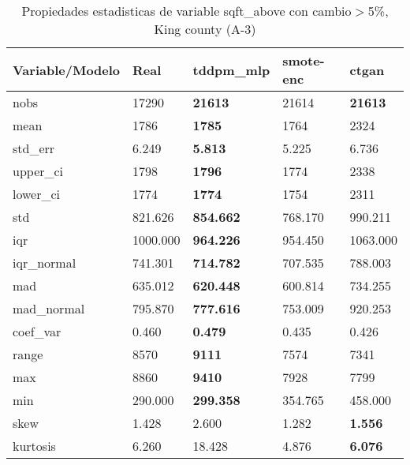 \begin{table}[H]
\centering
\fontsize{8}{14}\selectfont
\caption{Propiedades estadisticas de variable sqft\_above con cambio\ensuremath{>}5\%, King county (A-3)}
\label{table-stats-king county-a-3-sqft_above-short}
\begin{tabular}{|l|m{10em}|m{10em}|m{10em}|m{10em}|}
\hline
 \rowcolor[gray]{0.8}
Variable/Modelo & Real & tddpm\_mlp & smote-enc & ctgan \\
\hline nobs & 17290 & \bfseries 21613 & \cellcolor[rgb]{0.9, 0.54, 0.52} 21614 & \bfseries 21613 \\
\hline mean & 1786 & \bfseries 1785 & 1764 & \cellcolor[rgb]{0.9, 0.54, 0.52} 2324 \\
\hline std\_err & 6.249 & \bfseries 5.813 & \cellcolor[rgb]{0.9, 0.54, 0.52} 5.225 & 6.736 \\
\hline upper\_ci & 1798 & \bfseries 1796 & 1774 & \cellcolor[rgb]{0.9, 0.54, 0.52} 2338 \\
\hline lower\_ci & 1774 & \bfseries 1774 & 1754 & \cellcolor[rgb]{0.9, 0.54, 0.52} 2311 \\
\hline std & 821.626 & \bfseries 854.662 & 768.170 & \cellcolor[rgb]{0.9, 0.54, 0.52} 990.211 \\
\hline iqr & 1000.000 & \bfseries 964.226 & 954.450 & \cellcolor[rgb]{0.9, 0.54, 0.52} 1063.000 \\
\hline iqr\_normal & 741.301 & \bfseries 714.782 & 707.535 & \cellcolor[rgb]{0.9, 0.54, 0.52} 788.003 \\
\hline mad & 635.012 & \bfseries 620.448 & 600.814 & \cellcolor[rgb]{0.9, 0.54, 0.52} 734.255 \\
\hline mad\_normal & 795.870 & \bfseries 777.616 & 753.009 & \cellcolor[rgb]{0.9, 0.54, 0.52} 920.253 \\
\hline coef\_var & 0.460 & \bfseries 0.479 & 0.435 & \cellcolor[rgb]{0.9, 0.54, 0.52} 0.426 \\
\hline range & 8570 & \bfseries 9111 & 7574 & \cellcolor[rgb]{0.9, 0.54, 0.52} 7341 \\
\hline max & 8860 & \bfseries 9410 & 7928 & \cellcolor[rgb]{0.9, 0.54, 0.52} 7799 \\
\hline min & 290.000 & \bfseries 299.358 & 354.765 & \cellcolor[rgb]{0.9, 0.54, 0.52} 458.000 \\
\hline skew & 1.428 & \cellcolor[rgb]{0.9, 0.54, 0.52} 2.600 & 1.282 & \bfseries 1.556 \\
\hline kurtosis & 6.260 & \cellcolor[rgb]{0.9, 0.54, 0.52} 18.428 & 4.876 & \bfseries 6.076 \\

\end{tabular}
\end{table}
